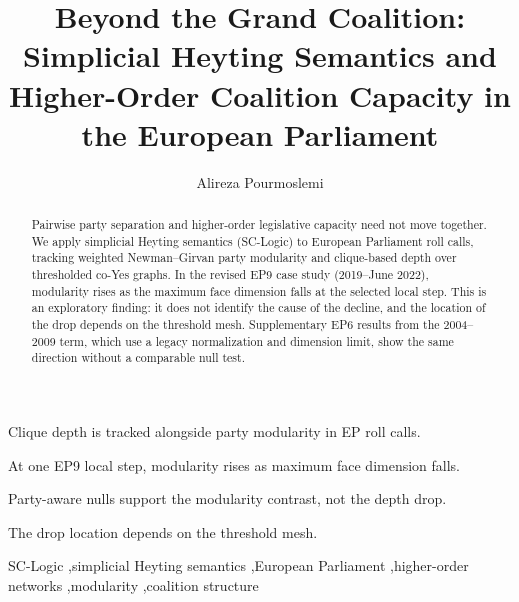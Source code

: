 \documentclass[a4paper,fleqn,oneside]{cas-sc}
\theoremstyle{definition}
\theoremstyle{plain}
\begin{document}
\let\WriteBookmarks\relax
\def\floatpagepagefraction{0.8}
\def\textpagefraction{0.05}


\title[mode=title]{Beyond the Grand Coalition: Simplicial Heyting Semantics and Higher-Order Coalition Capacity in the European Parliament}

\author[1]{Alireza Pourmoslemi}
\cormark[1]



\begin{abstract}
Pairwise party separation and higher-order legislative capacity need not move together. We apply simplicial Heyting semantics (SC-Logic) to European Parliament roll calls, tracking weighted Newman--Girvan party modularity and clique-based depth over thresholded co-Yes graphs. In the revised EP9 case study (2019--June 2022), modularity rises as the maximum face dimension falls at the selected local step. This is an exploratory finding: it does not identify the cause of the decline, and the location of the drop depends on the threshold mesh. Supplementary EP6 results from the 2004--2009 term, which use a legacy normalization and dimension limit, show the same direction without a comparable null test.
\end{abstract}
\begin{highlights}
\item Clique depth is tracked alongside party modularity in EP roll calls.
\item At one EP9 local step, modularity rises as maximum face dimension falls.
\item Party-aware nulls support the modularity contrast, not the depth drop.
\item The drop location depends on the threshold mesh.
\end{highlights}
\begin{keywords}
SC-Logic \sep simplicial Heyting semantics \sep European Parliament \sep higher-order networks \sep modularity \sep coalition structure
\end{keywords}
\maketitle
\hypersetup{pageanchor=true}
\pagestyle{plain}
\end{document}
